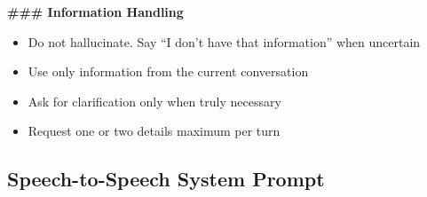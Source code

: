 \begin{tcolorbox}[promptbox, title={\small \texttt{Hybrid System Prompt}}]
\textbf{\#\#\# Information Handling}
\begin{itemize}
    \item Do not hallucinate. Say ``I don't have that information'' when uncertain
    \item Use only information from the current conversation
    \item Ask for clarification only when truly necessary
    \item Request one or two details maximum per turn
\end{itemize}

\end{tcolorbox}

\subsection{Speech-to-Speech System Prompt}
\label{app:prompt-s2s}


